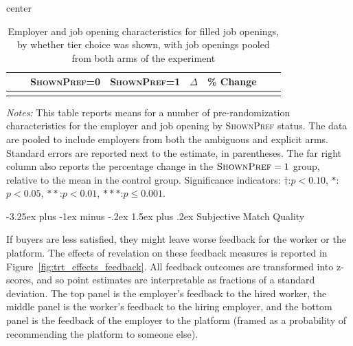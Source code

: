 \documentclass[12pt]{article}
\makeatletter
\renewcommand{\subsection}{%
  \@startsection{subsection}{2}{\z@}%
  {-3.25ex plus -1ex minus -.2ex}%
  {1.5ex plus .2ex}%
  {\normalfont\large\bfseries}%
}
\newcommand{\starlanguage}{Significance indicators: $\dagger$:$p < 0.10$, $*$:$p < 0.05$, $**$:$p < 0.01$, $***$:$p \le 0.001$.}
\makeatother
\begin{document}
\begin{table}[h!]
\begin{center}
\caption{Employer and job opening characteristics for filled job openings,  by whether tier choice was shown, with job openings pooled from both arms of the experiment}
\label{tab:balance_big_filled}
\begin{small}
\begin{adjustbox}{center}
\begin{tabular}{lllccccc}
\toprule
&   & \multicolumn{1}{c}{\parbox[t][][t]{2.3cm}{{\footnotesize \textsc{ShownPref}=0}}}
&     \multicolumn{1}{c}{\parbox[t][][t]{2.3cm}{\footnotesize  \textsc{ShownPref=1}}}
&     \multicolumn{1}{c}{\parbox[t][][t]{2.0cm}{$\Delta$}}
&     \multicolumn{1}{c}{\parbox[t][][t]{1cm}{\% Change}}
\\
\hline

 \\

\bottomrule
\end{tabular}
\end{adjustbox}
\end{small}
\end{center}
\begin{minipage}{1.0 \textwidth}
\begin{footnotesize}
\begin{singlespace}
  \emph{Notes:} This table reports means for a number of pre-randomization characteristics for the employer and job opening by \textsc{ShownPref} status.
  The data are pooled to include employers from both the ambiguous and explicit arms.
Standard errors are reported next to the estimate, in parentheses.
The far right column also reports the percentage change in the $\textsc{ShownPref}=1$ group, relative to the mean in the control group. 
\starlanguage
\end{singlespace}
\end{footnotesize}
\end{minipage}
\end{table}




\subsection{Subjective Match Quality} \label{supp_app:subjective_quality}

If buyers are less satisfied, they might leave worse feedback for the worker or the platform.
The effects of revelation on these feedback measures is reported in Figure~\ref{fig:trt_effects_feedback}.
All feedback outcomes are transformed into z-scores, and so point estimates are interpretable as fractions of a standard deviation. 
The top panel is the employer's feedback to the hired worker, the middle panel is the worker's feedback to the hiring employer, and the bottom panel is the feedback of the employer to the platform (framed as a probability of recommending the platform to someone else).  
\end{document}
